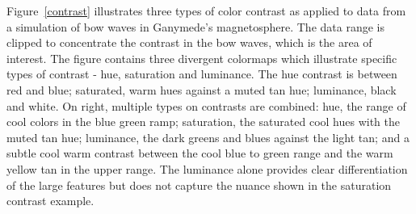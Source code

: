 \documentclass{IEEEcsmag}
\newcommand*{\km}[1]{\textcolor{km}{\emph{\textbf{#1} -- KM}}}
\newcommand*{\fs}[1]{\textcolor{fs}{\emph{\textbf{#1} -- FS}}}
\newcommand*{\colormap}[1]{\textsl{#1}\xspace}
\newcommand*{\fast}{\colormap{Fast}}
\begin{document}
Figure~\ref{contrast} illustrates three types of color contrast as applied to data from a simulation of bow waves in Ganymede's magnetosphere. The data range is clipped to concentrate the contrast in the bow waves, which is the area of interest. The figure contains three divergent colormaps which illustrate specific types of contrast - hue, saturation and luminance. The hue contrast is between red and blue; saturated, warm hues against a muted tan hue; luminance, black and white. On right, multiple types on contrasts are combined: hue, the range of cool colors in the blue green ramp; saturation, the saturated cool hues with the muted tan hue; luminance, the dark greens and blues against the light tan; and a subtle cool warm contrast between the cool blue to green range and the warm yellow tan in the upper range. The luminance alone provides clear differentiation of the large features but does not capture the nuance shown in the saturation contrast example.






\end{document}
